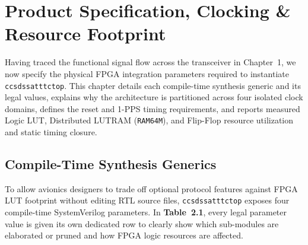 \documentclass[10pt,a4paper]{article}
\renewcommand{\_}{\origunderscore\penalty0\hskip0pt\relax}
\numberwithin{table}{section}
\numberwithin{figure}{section}
\numberwithin{equation}{section}
\begin{document}
\vspace{6pt}
\section{Product Specification, Clocking \& Resource Footprint}

Having traced the functional signal flow across the transceiver in Chapter~1, we now specify the physical FPGA integration parameters required to instantiate \texttt{ccsds\_sat\_ttc\_top}. This chapter details each compile-time synthesis generic and its legal values, explains why the architecture is partitioned across four isolated clock domains, defines the reset and 1-PPS timing requirements, and reports measured Logic LUT, Distributed LUTRAM (\texttt{RAM64M}), and Flip-Flop resource utilization and static timing closure.

\subsection{Compile-Time Synthesis Generics}
To allow avionics designers to trade off optional protocol features against FPGA LUT footprint without editing RTL source files, \texttt{ccsds\_sat\_ttc\_top} exposes four compile-time SystemVerilog parameters. In \textbf{Table~2.1}, every legal parameter value is given its own dedicated row to clearly show which sub-modules are elaborated or pruned and how FPGA logic resources are affected.
\end{document}
